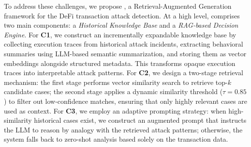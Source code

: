 To address these challenges, we propose \approach, a Retrieval-Augmented Generation framework for the DeFi transaction attack detection. At a high level, \approach{} comprises two main components: a \textit{Historical Knowledge Base} and a \textit{RAG-based Decision Engine}. For \textbf{C1}, we construct an incrementally expandable knowledge base by collecting execution traces from historical attack incidents, extracting behavioral summaries using LLM-based semantic summarization, and storing them as vector embeddings alongside structured metadata. This transforms opaque execution traces into interpretable attack patterns. For \textbf{C2}, we design a two-stage retrieval mechanism: the first stage performs vector similarity search to retrieve top-$k$ candidate cases; the second stage applies a dynamic similarity threshold ($\tau = 0.85$) to filter out low-confidence matches, ensuring that only highly relevant cases are used as context. For \textbf{C3}, we employ an adaptive prompting strategy: when high-similarity historical cases exist, we construct an augmented prompt that instructs the LLM to reason by analogy with the retrieved attack patterns; otherwise, the system falls back to zero-shot analysis based solely on the transaction data. 


